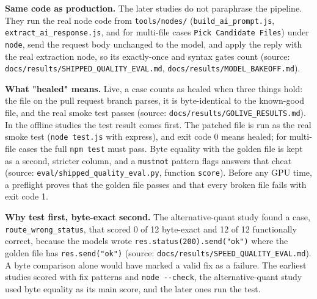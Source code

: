 \documentclass[11pt,a4paper]{report}
\begin{document}
\textbf{Same code as production.} The later studies do not paraphrase the pipeline. They run the real node code from \texttt{tools/\allowbreak{}nodes/\allowbreak{}} (\texttt{build\_\allowbreak{}ai\_\allowbreak{}prompt.\allowbreak{}js}, \texttt{extract\_\allowbreak{}ai\_\allowbreak{}response.\allowbreak{}js}, and for multi-file cases \texttt{Pick Candidate Files}) under \texttt{node}, send the request body unchanged to the model, and apply the reply with the real extraction node, so its exactly-once and syntax gates count (source: \texttt{docs/\allowbreak{}results/\allowbreak{}SHIPPED\_\allowbreak{}QUALITY\_\allowbreak{}EVAL.\allowbreak{}md}, \texttt{docs/\allowbreak{}results/\allowbreak{}MODEL\_\allowbreak{}BAKEOFF.\allowbreak{}md}).

\textbf{What "healed" means.} Live, a case counts as healed when three things hold: the file on the pull request branch parses, it is byte-identical to the known-good file, and the real smoke test passes (source: \texttt{docs/\allowbreak{}results/\allowbreak{}GOLIVE\_\allowbreak{}RESULTS.\allowbreak{}md}). In the offline studies the test result comes first. The patched file is run as the real smoke test (\texttt{node test.\allowbreak{}js} with express), and exit code 0 means healed; for multi-file cases the full \texttt{npm test} must pass. Byte equality with the golden file is kept as a second, stricter column, and a \texttt{mustnot} pattern flags answers that cheat (source: \texttt{eval/\allowbreak{}shipped\_\allowbreak{}quality\_\allowbreak{}eval.\allowbreak{}py}, function \texttt{score}). Before any GPU time, a preflight proves that the golden file passes and that every broken file fails with exit code 1.

\textbf{Why test first, byte-exact second.} The alternative-quant study found a case, \texttt{route\_\allowbreak{}wrong\_\allowbreak{}status}, that scored 0 of 12 byte-exact and 12 of 12 functionally correct, because the models wrote \texttt{res.\allowbreak{}status(200).\allowbreak{}send("ok")} where the golden file has \texttt{res.\allowbreak{}send("ok")} (source: \texttt{docs/\allowbreak{}results/\allowbreak{}SPEED\_\allowbreak{}QUALITY\_\allowbreak{}EVAL.\allowbreak{}md}). A byte comparison alone would have marked a valid fix as a failure. The earliest studies scored with fix patterns and \texttt{node -\allowbreak{}-\allowbreak{}check}, the alternative-quant study used byte equality as its main score, and the later ones run the test.
\end{document}

